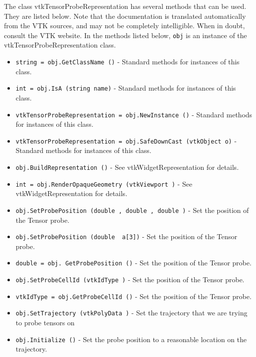 The class vtkTensorProbeRepresentation has several methods that can be used.
  They are listed below.
Note that the documentation is translated automatically from the VTK sources,
and may not be completely intelligible.  When in doubt, consult the VTK website.
In the methods listed below, \verb|obj| is an instance of the vtkTensorProbeRepresentation class.
\begin{itemize}
\item  \verb|string = obj.GetClassName ()| -  Standard methods for instances of this class.

\item  \verb|int = obj.IsA (string name)| -  Standard methods for instances of this class.

\item  \verb|vtkTensorProbeRepresentation = obj.NewInstance ()| -  Standard methods for instances of this class.

\item  \verb|vtkTensorProbeRepresentation = obj.SafeDownCast (vtkObject o)| -  Standard methods for instances of this class.

\item  \verb|obj.BuildRepresentation ()| -  See vtkWidgetRepresentation for details.

\item  \verb|int = obj.RenderOpaqueGeometry (vtkViewport )| -  See vtkWidgetRepresentation for details.

\item  \verb|obj.SetProbePosition (double , double , double )| -  Set the position of the Tensor probe.

\item  \verb|obj.SetProbePosition (double  a[3])| -  Set the position of the Tensor probe.

\item  \verb|double = obj. GetProbePosition ()| -  Set the position of the Tensor probe.

\item  \verb|obj.SetProbeCellId (vtkIdType )| -  Set the position of the Tensor probe.

\item  \verb|vtkIdType = obj.GetProbeCellId ()| -  Set the position of the Tensor probe.

\item  \verb|obj.SetTrajectory (vtkPolyData )| -  Set the trajectory that we are trying to probe tensors on

\item  \verb|obj.Initialize ()| -  Set the probe position to a reasonable location on the trajectory.


\end{itemize}
